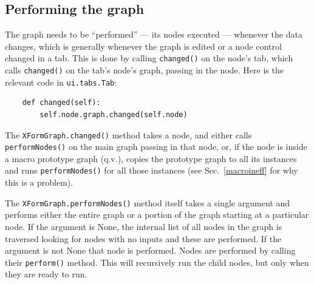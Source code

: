 \subsection{Performing the graph}
\label{graphperform}
The graph needs to be ``performed'' --- its nodes executed --- whenever
the data changes, which is generally whenever the graph is edited or
a node control changed in a tab.
This is done by calling \texttt{changed()} on the node's tab, which calls 
\texttt{changed()} on the tab's node's graph, passing in the node. Here is the 
relevant code in \texttt{ui.tabs.Tab}:
\begin{lstlisting}
    def changed(self):
        self.node.graph.changed(self.node)
\end{lstlisting}
The \texttt{XFormGraph.changed()} method takes a node, and either calls
\texttt{performNodes()} on the main graph passing in that node, or, if the
node is inside a macro prototype graph (q.v.), copies the prototype graph to
all its instances and runs \texttt{performNodes()} for all those instances
(see Sec.~\ref{macroineff} for why this is a problem).

The \texttt{XFormGraph.performNodes()} method itself takes a single argument and performs
either the entire graph or a portion of the graph starting at a particular node.
If the argument is None, the internal list of all nodes in the graph is traversed looking
for nodes with no inputs and these are performed. If the argument is not None that node
is performed. Nodes are performed by calling their \texttt{perform()} method. This will
recursively run the child nodes, but only when they are ready to run. 

\clearpage
